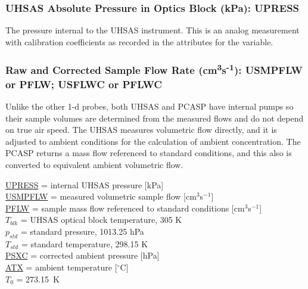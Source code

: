 \documentclass[
  english,
]{book}
\begin{document}
\hypertarget{upress}{%
\subsubsection*{UHSAS Absolute Pressure in Optics Block (kPa):
UPRESS}\label{upress}}

The pressure internal to the UHSAS instrument. This is an analog
measurement with calibration coefficients as recorded in the attributes
for the variable.

\hypertarget{pflw}{%
\subsubsection*{\texorpdfstring{Raw and Corrected Sample Flow Rate
(cm\textsuperscript{3}s\textsuperscript{-1}): USMPFLW or PFLW; USFLWC or
PFLWC}{Raw and Corrected Sample Flow Rate (cm3s-1): USMPFLW or PFLW; USFLWC or PFLWC}}\label{pflw}}

Unlike the other 1-d probes, both UHSAS and PCASP have internal pumps so
their sample volumes are determined from the measured flows and do not
depend on true air speed. The UHSAS measures volumetric flow directly,
and it is adjusted to ambient conditions for the calculation of ambient
concentration. The PCASP returns a mass flow referenced to standard
conditions, and this also is converted to equivalent ambient volumetric
flow.

\protect\hyperlink{upress}{UPRESS} = internal UHSAS pressure
{[}kPa{]}\\
\protect\hyperlink{pflw}{USMPFLW} = measured volumetric sample flow
{[}cm\(^{3}\)s\(^{-1}\){]}\\
\protect\hyperlink{pflw}{PFLW} = sample mass flow referenced to standard
conditions {[}cm\(^{3}\)s\(^{-1}\){]}\\
\(T_{blk}\) = UHSAS optical block temperature, 305 K\\
\(p_{std}\) = standard pressure, 1013.25 hPa\\
\(T_{std}\) = standard temperature, 298.15 K\\
\href{./4-the-state-of-the-atmosphere.html\#psx}{PSXC} = corrected
ambient pressure {[}hPa{]}\\
\href{./4-the-state-of-the-atmosphere.html\#ambient-t}{ATX} = ambient
temperature {[}\(^{\circ}\)C{]}\\
\(T_{0}\) = 273.15~K
\end{document}
